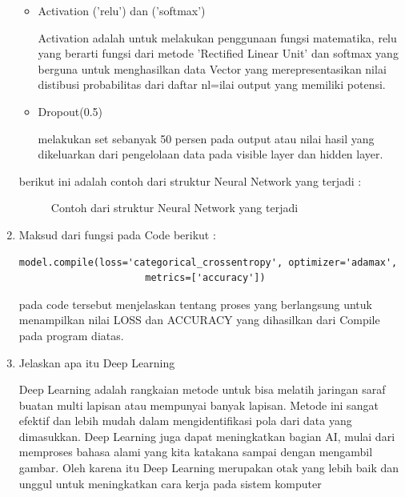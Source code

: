 \begin{enumerate}
\begin{itemize}
\item Activation ('relu') dan ('softmax')
\par Activation adalah untuk melakukan penggunaan fungsi matematika, relu yang berarti fungsi dari metode 'Rectified Linear Unit' dan softmax yang berguna untuk menghasilkan data Vector yang merepresentasikan nilai distibusi probabilitas dari daftar nl=ilai output yang memiliki potensi.

\item Dropout(0.5)
\par melakukan set sebanyak 50 persen pada output atau nilai hasil yang dikeluarkan dari pengelolaan data pada visible layer dan hidden layer.
\end{itemize}
\par berikut ini adalah contoh dari struktur Neural Network yang terjadi :
\begin{figure}[!htbp]
      \caption{Contoh dari struktur Neural Network yang terjadi}
      \label{data10}
\end{figure}

\item Maksud dari fungsi pada Code berikut :
\begin{lstlisting}[caption=Compile model,label={lst:3}]
	model.compile(loss='categorical_crossentropy', optimizer='adamax',
	                  metrics=['accuracy'])
\end{lstlisting}
\par pada code tersebut menjelaskan tentang proses yang berlangsung untuk menampilkan nilai LOSS dan ACCURACY yang dihasilkan dari Compile pada program diatas.

\item Jelaskan apa itu Deep Learning
\par Deep Learning adalah rangkaian metode untuk bisa melatih jaringan saraf buatan multi lapisan atau mempunyai banyak lapisan. Metode ini sangat efektif dan lebih mudah dalam mengidentifikasi pola dari data yang dimasukkan. Deep Learning juga dapat meningkatkan bagian AI, mulai dari memproses bahasa alami yang kita katakana sampai dengan mengambil gambar. Oleh karena itu Deep Learning merupakan otak yang lebih baik dan unggul untuk meningkatkan cara kerja pada sistem komputer


\end{enumerate}
